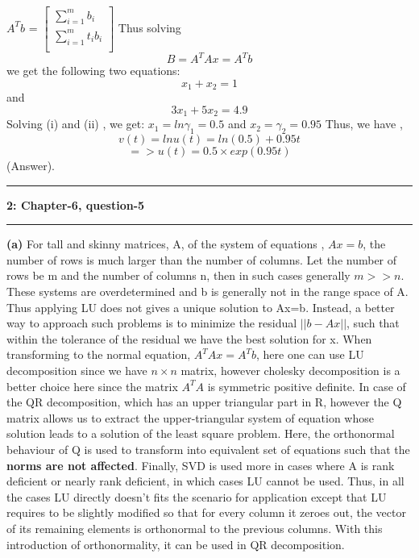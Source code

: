 \documentclass{article}
\newcommand\question[2]{\vspace{.25in}\hrule\textbf{#1: #2}\hrule\vspace{.10in}}
\renewcommand\part[1]{\vspace{.10in}\textbf{(#1)}}
\begin{document}
$A^Tb$ = $\begin{bmatrix}
	\sum_{i=1}^m b_i \\
	\sum_{i=1}^m t_ib_i \\
\end{bmatrix}$
Thus solving
\[ B = A^TAx = A^Tb\]
we get the following two equations: \newline
\begin{equation}
	x_1 + x_2 = 1
\end{equation}
and 
\begin{equation}
	3x_1 + 5x_2 = 4.9
\end{equation}
Solving (i) and (ii) , we get: $x_1 = ln\gamma_1 = 0.5$ and $x_2 = \gamma_2 = 0.95$ \newline
Thus, we have , 
\[v(t) = lnu(t) = ln(0.5) + 0.95t\]
\[=> u(t) = 0.5 \times exp(0.95t)\]
(Answer). \newline

\question{2}{Chapter-6, question-5}
\part{a} For tall and skinny matrices, A, of the system of equations , $Ax=b$, the number of rows is much larger than  the number of columns. Let the number of rows be m and the number of columns n, then in such cases generally $m >> n$. These systems are overdetermined and b is generally not in the range space of A. Thus applying LU does not gives a unique solution to Ax=b. Instead, a better way to approach such problems is to minimize the residual $||b-Ax||$, such that within the tolerance of the residual we have the best solution for x. When transforming to the normal equation, $A^TAx = A^Tb$, here one can use LU decomposition since we have $n\times n$ matrix, however cholesky decomposition is a better choice here since the matrix $A^TA$ is symmetric positive definite. In case of the QR decomposition, which has an upper triangular part in R, however the Q matrix allows us to extract the upper-triangular system of equation whose solution leads to a solution of the least square problem. Here, the orthonormal behaviour of Q is used to transform into equivalent set of equations such that the \textbf {norms are not affected}. Finally, SVD is used more in cases where A is rank deficient or nearly rank deficient, in which cases LU cannot be used. Thus, in all the cases LU directly doesn't fits the scenario for application except that LU requires to be slightly modified so that for every column it zeroes out, the vector of its remaining elements is orthonormal to the previous columns. With this introduction of orthonormality, it can be used in QR decomposition. \newline
\end{document}
